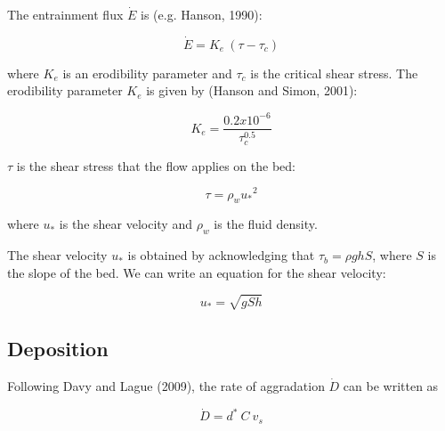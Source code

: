\documentclass[11pt]{article}
\begin{document}
The entrainment flux $\dot{E}$ is (e.g. Hanson, 1990):

\begin{equation}
\dot{E} = K_e \: (\tau - {\tau_c})
\end{equation}

\noindent where $K_e$ is an erodibility parameter and ${\tau_c}$ is the critical shear stress. The erodibility parameter $K_e$ is given by (Hanson and Simon, 2001):
 
\begin{equation}
K_e = \frac{0.2 x 10^{-6}}{\tau_c^{0.5}}
\end{equation}

$\tau$ is the shear stress that the flow applies on the bed:

\begin{equation}
\tau = \rho_w {u_*}^2
\end{equation}

\noindent where $u_*$ is the shear velocity and $\rho_w$ is the fluid density.

The shear velocity $u_*$ is obtained by acknowledging that $\tau_b = \rho g h S$, where $S$ is the slope of the bed. We can write an equation for the shear velocity:

\begin{equation}
u_* = \sqrt{g S h}
\end{equation}


%
%
%

\subsection{Deposition}

Following Davy and Lague (2009), the rate of aggradation $\dot{D}$ can be written as

\begin{equation}
\dot{D} = d^* \: C \: v_s
\end{equation}
\end{document}
